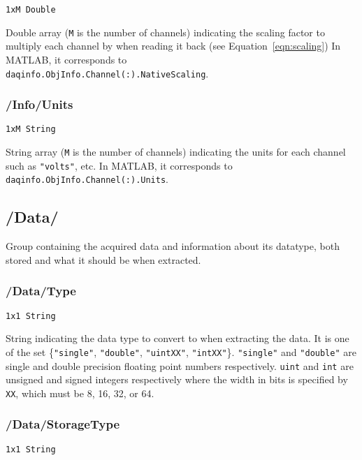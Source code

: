 \documentclass[12pt]{article} %
\begin{document}
\verb|1xM Double|

Double array (\verb|M| is the number of channels) indicating the scaling factor to multiply each channel by when reading it back (see Equation~\ref{eqn:scaling})
In MATLAB\textsuperscript{\textregistered}, it corresponds to \\ \verb|daqinfo.ObjInfo.Channel(:).NativeScaling|.



\subsubsection{/Info/Units}

\verb|1xM String|

String array (\verb|M| is the number of channels) indicating the units for each channel such as \verb|"volts"|, etc.
In MATLAB\textsuperscript{\textregistered}, it corresponds to \verb|daqinfo.ObjInfo.Channel(:).Units|.



\subsection{/Data/}

Group containing the acquired data and information about its datatype, both stored and what it should be when extracted.



\subsubsection{/Data/Type} \label{sec:data_type}

\verb|1x1 String|

String  indicating the data type to convert to when extracting the data.
It is one of the set \{\verb|"single"|, \verb|"double"|, \verb|"uintXX"|, \verb|"intXX"|\}.
\verb|"single"| and \verb|"double"| are single and double precision floating point numbers respectively.
\verb|uint| and \verb|int| are unsigned and signed integers respectively where the width in bits is specified by \verb|XX|, which must be 8, 16, 32, or 64.



\subsubsection{/Data/StorageType} \label{sec:data_storagetype}

\verb|1x1 String|
\end{document}
